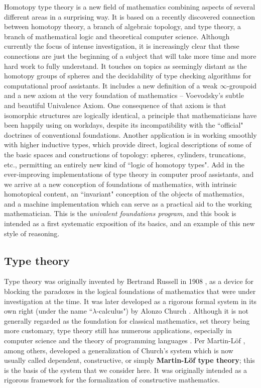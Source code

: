 {Homotopy type theory is a new field of mathematics combining aspects of several different areas in a surprising way.  It is based on a recently discovered connection between homotopy theory, a branch of algebraic topology, and type theory, a branch of mathematical logic and theoretical computer science.  Although currently the focus of intense investigation, it is increasingly clear that these connections are just the beginning of a subject that will take more time and more hard work to fully understand.  It touches on topics as seemingly distant as the homotopy groups of  spheres and the decidability of type checking algorithms for computational proof assistants.  It includes a new definition of a weak $\infty$-groupoid and a new axiom at the very foundation of mathematics -- Voevodsky's subtle and beautiful Univalence Axiom.  One consequence of that axiom is that isomorphic structures are logically identical, a principle that mathematicians have been happily using on workdays, despite its incompatibility with the ``official" doctrines of conventional foundations.  Another application is in working smoothly with higher inductive types, which provide direct, logical descriptions of some of the basic spaces and constructions of topology: spheres, cylinders, truncations, etc., permitting an entirely new kind of ``logic of homotopy types".   Add in the ever-improving  implementations of type theory in computer proof assistants, and we arrive at a new conception of foundations of mathematics, with intrinsic homotopical content, an ``invariant" conception of the objects of mathematics, and a machine implementation which can serve as a practical aid to the working mathematician.  This is the \emph{univalent foundations program}, and this book is intended as a first systematic exposition of its basics, and an example of this new style of reasoning. 


\subsection*{Type theory}

Type theory was originally invented by Bertrand Russell in 1908 \cite{Russell:1908}, as a device for blocking the paradoxes in the logical foundations of mathematics  that were under investigation at the time. It was later developed as a rigorous formal system  in its own right (under the name ``$\lambda$-calculus") by Alonzo Church \cite{Church:1933cl,Church:1940tu,Church:1941tc}.  Although it is not generally regarded as the foundation for classical mathematics, set theory being more customary, type theory still has numerous applications, especially in computer science and the theory of programming languages \cite{Pierce:2002tp}.   Per Martin-L\"{o}f \cite{MartinLof:1998tw,MartinLof:1975tb,MartinLof:1982bn,MartinLof:1984tr}, among others,
developed a generalization of Church's system which is now usually called dependent, constructive, or simply {\bf Martin\--L\"of type theory}; this is the basis of the system that we consider here. It was originally intended as a rigorous framework for the formalization of constructive mathematics.  

}
